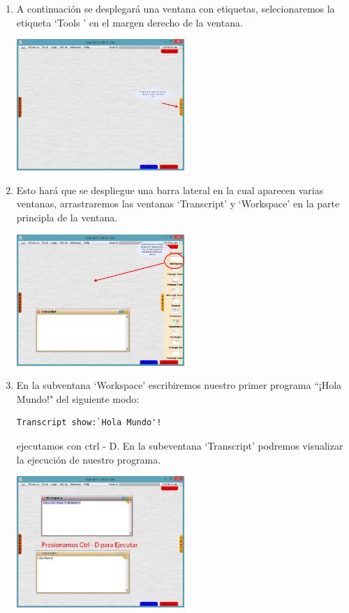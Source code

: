 \documentclass[11pt]{article}
\begin{document}
\begin{enumerate}
\item
A continuación se desplegará una ventana con etiquetas, selecionaremos la etiqueta `Tools ' en el margen derecho de la ventana.
				\begin{center}
				\includegraphics[width=0.5\textwidth]{images/tools}
				\end{center}
\item
Esto hará que se despliegue una barra lateral en la cual aparecen varias ventanas, arrastraremos las ventanas `Transcript' y `Workspace' en la parte principla de la ventana.
				\begin{center}
				\includegraphics[width=0.5\textwidth]{images/drag_tools}
				\end{center}
\item
En la subventana `Workspace' escribiremos nuestro primer programa ``¡Hola Mundo!" del siguiente modo:
\begin{lstlisting}
Transcript show:`Hola Mundo'! 
\end{lstlisting}
ejecutamos con ctrl - D. En la subeventana `Transcript' podremos visualizar la ejecución de nuestro programa.
				\begin{center}
				\includegraphics[width=0.5\textwidth]{images/executing}
				\end{center}
\end{enumerate}
\end{document}
